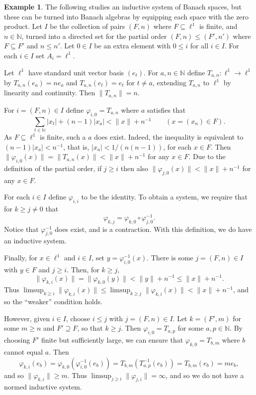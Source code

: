 \documentclass[a4paper,11pt]{article}
\theoremstyle{definition}
\newtheorem{example}[lemma]{Example}
\begin{document}
\begin{example}\label{ex:1}
The following studies an inductive system of Banach spaces, but these can be turned into Banach
algebras by equipping each space with the zero product.  Let $I$ be the collection of pairs
$(F,n)$ where $F\subseteq\ell^1$ is finite, and $n\in\mathbb N$, turned into a directed set for the
partial order $(F,n) \leq (F',n')$ where $F\subseteq F'$ and $n\leq n'$.  Let $0\in I$ be an extra
element with $0\leq i$ for all $i\in I$.  For each $i\in I$ set $A_i = \ell^1$.

Let $\ell^1$ have standard unit vector basis $(e_t)$.  For $a,n\in\mathbb N$ define $T_{a,n}:
\ell^1\rightarrow\ell^1$ by $T_{a,n}(e_a) = n e_a$ and $T_{a,n}(e_t) = e_t$ for $t\not=a$, extending
$T_{a,n}$ to $\ell^1$ by linearity and continuity.  Then $\|T_{a,n}\| = n$.

For $i=(F,n)\in I$ define $\varphi_{i,0} = T_{a,n}$ where $a$ satisfies that
\[ \sum_{t\in\mathbb N} |x_t| + (n-1)|x_a| < \|x\|+n^{-1} \qquad (x=(x_n) \in F). \]
As $F\subseteq \ell^1$ is finite, such a $a$ does exist.  Indeed, the inequality is equivalent to
$(n-1)|x_a| < n^{-1}$, that is, $|x_a| < 1/(n(n-1))$, for each $x\in F$.
Then $\|\varphi_{i,0}(x)\| = \|T_{a,n}(x)\| < \|x\|+n^{-1}$ for any $x\in F$.   Due to the
definition of the partial order, if $j\geq i$ then also $\|\varphi_{j,0}(x)\| < \|x\|+n^{-1}$ for
any $x\in F$.

For each $i\in I$ define $\varphi_{i,i}$ to be the identity.  To obtain a system, we require that
for $k\geq j\not=0$ that
\[ \varphi_{k,j} = \varphi_{k,0} \circ \varphi_{j,0}^{-1}. \]
Notice that $\varphi_{j,0}^{-1}$ does exist, and is a contraction.  With this definition, we do
have an inductive system.

Finally, for $x\in\ell^1$ and $i\in I$, set $y=\varphi_{i,0}^{-1}(x)$.  There is some $j=(F,n)\in I$
with $y\in F$ and $j\geq i$.  Then, for $k\geq j$,
\[ \|\varphi_{k,i}(x)\| = \|\varphi_{k,0}(y)\| < \|y\|+n^{-1} \leq \|x\| + n^{-1}. \]
Thus $\limsup_{k\geq i} \|\varphi_{k,i}(x)\| \leq \limsup_{k\geq j} \|\varphi_{k,i}(x)\|
< \|x\| + n^{-1}$, and so the ``weaker'' condition holds.

However, given $i\in I$, choose $i\leq j$ with $j=(F,n)\in I$.  Let $k=(F',m)$ for some $m\geq n$
and $F'\supseteq F$, so that $k\geq j$.  Then $\varphi_{i,0} = T_{a,p}$ for some $a,p\in\mathbb N$.
By choosing $F'$ finite but sufficiently large, we can ensure that $\varphi_{k,0} = T_{b,m}$ where
$b$ cannot equal $a$.  Then
\[ \varphi_{k,i}(e_b) = \varphi_{k,0}( \varphi_{i,0}^{-1}(e_b) )
= T_{b,m}( T_{a,p}^{-1}(e_b) )
= T_{b,m}(e_b)
= m e_b, \]
and so $\|\varphi_{k,i}\|\geq m$.  Thus $\limsup_{j\geq i} \|\varphi_{j,i}\| =\infty$, and
so we do not have a normed inductive system.
\end{example}
\end{document}
